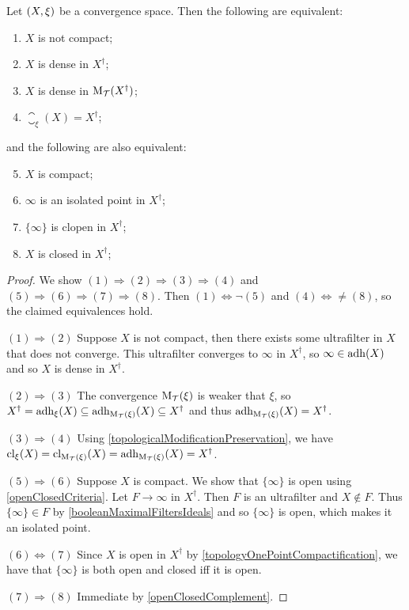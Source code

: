 \begin{lemma}
Let $\sSet{X, \xi}$ be a convergence space. Then the following are equivalent:
\begin{enumerate}
\item $X$ is not compact;
\item $X$ is dense in $X^\dagger$;
\item $X$ is dense in $\operatorname{M_\mathcal{T}}(X^\dagger)$;
\item $\closure_\xi(X) = X^\dagger$;
\end{enumerate}
and the following are also equivalent:
\begin{enumerate} \setcounter{enumi}{4}
\item $X$ is compact;
\item $\infty$ is an isolated point in $X^\dagger$;
\item $\{\infty\}$ is clopen in $X^\dagger$;
\item $X$ is closed in $X^\dagger$;
\end{enumerate}
\end{lemma}
\begin{proof}
We show $(1) \Rightarrow (2) \Rightarrow (3) \Rightarrow (4)$ and $(5) \Rightarrow (6) \Rightarrow (7) \Rightarrow (8)$. Then $(1) \Leftrightarrow \neg(5)$ and $(4) \Leftrightarrow \neq (8)$, so the claimed equivalences hold.

$(1) \Rightarrow (2)$ Suppose $X$ is not compact, then there exists some ultrafilter in $X$ that does not converge. This ultrafilter converges to $\infty$ in $X^\dagger$, so $\infty\in \operatorname{adh}(X)$ and so $X$ is dense in $X^\dagger$.

$(2) \Rightarrow (3)$ The convergence $\operatorname{M_\mathcal{T}}(\xi)$ is weaker that $\xi$, so $X^\dagger = \operatorname{adh}_\xi(X) \subseteq \operatorname{adh}_{\operatorname{M_\mathcal{T}}(\xi)}(X) \subseteq X^\dagger$ and thus $\operatorname{adh}_{\operatorname{M_\mathcal{T}}(\xi)}(X) = X^\dagger$.

$(3) \Rightarrow (4)$ Using \ref{topologicalModificationPreservation}, we have $\operatorname{cl}_\xi(X) = \operatorname{cl}_{\operatorname{M_\mathcal{T}}(\xi)}(X) = \operatorname{adh}_{\operatorname{M_\mathcal{T}}(\xi)}(X) = X^\dagger$.

$(5) \Rightarrow (6)$ Suppose $X$ is compact. We show that $\{\infty\}$ is open using \ref{openClosedCriteria}. Let $F \to \infty$ in $X^\dagger$. Then $F$ is an ultrafilter and $X\notin F$. Thus $\{\infty\}\in F$ by \ref{booleanMaximalFiltersIdeals} and so $\{\infty\}$ is open, which makes it an isolated point.

$(6) \Leftrightarrow (7)$ Since $X$ is open in $X^\dagger$ by \ref{topologyOnePointCompactification}, we have that $\{\infty\}$ is both open and closed iff it is open.

$(7) \Rightarrow (8)$ Immediate by \ref{openClosedComplement}.
\end{proof}

